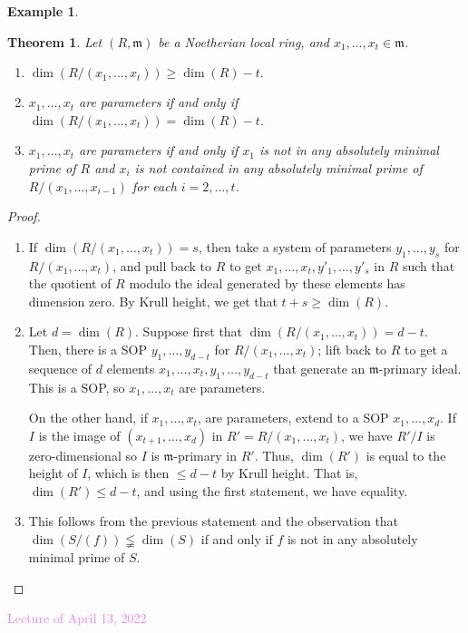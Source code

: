 \documentclass{amsart}[12pt]
\newcommand{\Apr}[1]{\textcolor{violet}{Lecture of April #1, 2022}}
\newcommand{\m}{{\mathfrak m}}
\numberwithin{equation}{section}
\theoremstyle{plain} %
\newtheorem{theorem}[equation]{Theorem}
\theoremstyle{definition}
\newtheorem{ex}[equation]{Example}
\theoremstyle{remark}
\begin{document}
\begin{ex}
\begin{theorem}
	Let $(R,\m)$ be a Noetherian local ring, and $x_1,\dots,x_t\in \m$.
	\begin{enumerate}
	\item ${\dim(R/(x_1,\dots,x_t))\geq \dim(R)-t}.$ 
	\item $x_1,\dots,x_t$
	are parameters if and only if $\dim(R/(x_1,\dots,x_t))=\dim(R)-t$.
	\item $x_1,\dots,x_t$ are parameters if and only if $x_1$ is not in any absolutely minimal prime of $R$ and $x_i$ is not contained in any absolutely minimal prime of $R/(x_1,\dots,x_{i-1})$ for each $i=2,\dots,t$.
\end{enumerate}
\end{theorem}
\begin{proof}
	\begin{enumerate}
		\item If $\dim(R/(x_1,\dots,x_t)) = s$, then take a system of parameters $y_1,\dots,y_s$ for $R/(x_1,\dots,x_t)$, and pull back to $R$ to get $x_1,\dots,x_t,y'_1,\dots,y'_s$ in $R$ such that the quotient of $R$ modulo the ideal generated by these elements has dimension zero. By Krull height, we get that $t+s\geq \dim(R)$.
		
		\item Let $d=\dim(R)$. Suppose first that $\dim(R/(x_1,\dots,x_t))=d-t$. Then, there is a SOP  $y_1,\dots,y_{d-t}$ for $R/(x_1,\dots,x_t)$; lift back to $R$ to get a sequence of $d$ elements $x_1,\dots,x_t,y_1,\dots,y_{d-t}$ that generate an $\m$-primary ideal. This is a SOP, so $x_1,\dots,x_t$ are parameters.
		
		On the other hand, if $x_1,\dots,x_t$, are parameters, extend to a SOP $x_1,\dots,x_d$. If $I$ is the image of $(x_{t+1},\dots,x_d)$  in $R'=R/(x_1,\dots,x_t)$, we have $R'/I$ is zero-dimensional so $I$ is $\m$-primary in $R'$. Thus, $\dim(R')$ is equal to the height of $I$, which is then $\leq d-t$ by Krull height. That is, $\dim(R') \leq d-t$, and using the first statement, we have equality.
		
		 \item This follows from the previous statement and the observation that $\dim(S/(f)) \lneqq \dim(S)$ if and only if $f$ is not in any absolutely minimal prime of $S$.\qedhere
	\end{enumerate}
\end{proof}

\Apr{13}


\end{ex}
\end{document}
